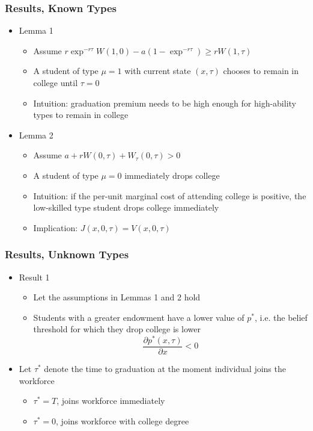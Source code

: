 \begin{frame}
	\frametitle{Results, Known Types}
		\begin{itemize}
			\item Lemma 1
				\begin{itemize}
					\item Assume $r \exp^{-r \tau} W(1,0) - a (1 - \exp^{-r \tau})  \geq r W(1, \tau)$
					\item A student of type $\mu = 1$ with current state $(x,\tau)$ chooses to remain in college until $\tau = 0$
					\item Intuition: graduation premium needs to be high enough for high-ability types to remain in college 
				\end{itemize}
			\item Lemma 2
				\begin{itemize}
					\item Assume $a + r W(0,\tau) + W_{\tau} (0,\tau) > 0$	
					\item A student of type $\mu = 0$ immediately drops college
					\item Intuition: if the per-unit marginal cost of attending college is positive, the low-skilled type student drops college immediately
					\item Implication: $J(x,0,\tau) = V(x,0,\tau)$
				\end{itemize}				 
		\end{itemize}
\end{frame}

\begin{frame}
	\frametitle{Results, Unknown Types}
		\begin{itemize}
			\item Result 1
				\begin{itemize}
					\item Let the assumptions in Lemmas 1 and 2 hold
					\item Students with a greater endowment have a lower value of $p^*$, i.e. the belief threshold for which they drop college is lower
					\begin{equation}
						\frac{\partial p^*(x, \tau)}{\partial x} < 0
					\end{equation}
				\end{itemize}
			\item Let $\tau^*$ denote the time to graduation at the moment individual joins the workforce
				\begin{itemize}
					\item $\tau^* = T$, joins workforce immediately
					\item $\tau^* = 0$, joins workforce with college degree
				\end{itemize}
		\end{itemize}
\end{frame}

